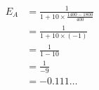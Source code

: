 \documentclass[preview]{standalone}
\begin{document}
\begin{align*}
E_A &= \frac{1}{1 + 10 \times \frac{1400 - 1800}{400}} \\ &= \frac{1}{1 + 10 \times (-1)} \\ &= \frac{1}{1 - 10} \\ &= \frac{1}{-9} \\ &= -0.111\ldots
\end{align*}
\end{document}

